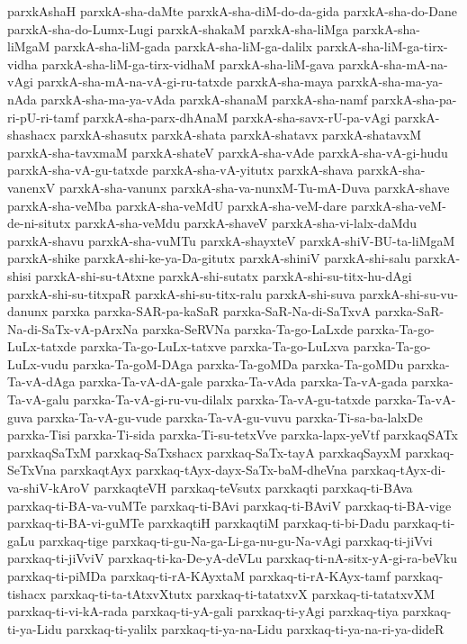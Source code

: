 {parxkAshaH
parxkA-sha-daMte
parxkA-sha-diM-do-da-gida
parxkA-sha-do-Dane
parxkA-sha-do-Lumx-Lugi
parxkA-shakaM
parxkA-sha-liMga
parxkA-sha-liMgaM
parxkA-sha-liM-gada
parxkA-sha-liM-ga-dalilx
parxkA-sha-liM-ga-tirx-vidha
parxkA-sha-liM-ga-tirx-vidhaM
parxkA-sha-liM-gava
parxkA-sha-mA-na-vAgi
parxkA-sha-mA-na-vA-gi-ru-tatxde
parxkA-sha-maya
parxkA-sha-ma-ya-nAda
parxkA-sha-ma-ya-vAda
parxkA-shanaM
parxkA-sha-namf
parxkA-sha-pa-ri-pU-ri-tamf
parxkA-sha-parx-dhAnaM
parxkA-sha-savx-rU-pa-vAgi
parxkA-shashacx
parxkA-shasutx
parxkA-shata
parxkA-shatavx
parxkA-shatavxM
parxkA-sha-tavxmaM
parxkA-shateV
parxkA-sha-vAde
parxkA-sha-vA-gi-hudu
parxkA-sha-vA-gu-tatxde
parxkA-sha-vA-yitutx
parxkA-shava
parxkA-sha-vanenxV
parxkA-sha-vanunx
parxkA-sha-va-nunxM-Tu-mA-Duva
parxkA-shave
parxkA-sha-veMba
parxkA-sha-veMdU
parxkA-sha-veM-dare
parxkA-sha-veM-de-ni-situtx
parxkA-sha-veMdu
parxkA-shaveV
parxkA-sha-vi-lalx-daMdu
parxkA-shavu
parxkA-sha-vuMTu
parxkA-shayxteV
parxkA-shiV-BU-ta-liMgaM
parxkA-shike
parxkA-shi-ke-ya-Da-gitutx
parxkA-shiniV
parxkA-shi-salu
parxkA-shisi
parxkA-shi-su-tAtxne
parxkA-shi-sutatx
parxkA-shi-su-titx-hu-dAgi
parxkA-shi-su-titxpaR
parxkA-shi-su-titx-ralu
parxkA-shi-suva
parxkA-shi-su-vu-danunx
parxka
parxka-SAR-pa-kaSaR
parxka-SaR-Na-di-SaTxvA
parxka-SaR-Na-di-SaTx-vA-pArxNa
parxka-SeRVNa
parxka-Ta-go-LaLxde
parxka-Ta-go-LuLx-tatxde
parxka-Ta-go-LuLx-tatxve
parxka-Ta-go-LuLxva
parxka-Ta-go-LuLx-vudu
parxka-Ta-goM-DAga
parxka-Ta-goMDa
parxka-Ta-goMDu
parxka-Ta-vA-dAga
parxka-Ta-vA-dA-gale
parxka-Ta-vAda
parxka-Ta-vA-gada
parxka-Ta-vA-galu
parxka-Ta-vA-gi-ru-vu-dilalx
parxka-Ta-vA-gu-tatxde
parxka-Ta-vA-guva
parxka-Ta-vA-gu-vude
parxka-Ta-vA-gu-vuvu
parxka-Ti-sa-ba-lalxDe
parxka-Tisi
parxka-Ti-sida
parxka-Ti-su-tetxVve
parxka-lapx-yeVtf
parxkaqSATx
parxkaqSaTxM
parxkaq-SaTxshacx
parxkaq-SaTx-tayA
parxkaqSayxM
parxkaq-SeTxVna
parxkaqtAyx
parxkaq-tAyx-dayx-SaTx-baM-dheVna
parxkaq-tAyx-di-va-shiV-kAroV
parxkaqteVH
parxkaq-teVsutx
parxkaqti
parxkaq-ti-BAva
parxkaq-ti-BA-va-vuMTe
parxkaq-ti-BAvi
parxkaq-ti-BAviV
parxkaq-ti-BA-vige
parxkaq-ti-BA-vi-guMTe
parxkaqtiH
parxkaqtiM
parxkaq-ti-bi-Dadu
parxkaq-ti-gaLu
parxkaq-tige
parxkaq-ti-gu-Na-ga-Li-ga-nu-gu-Na-vAgi
parxkaq-ti-jiVvi
parxkaq-ti-jiVviV
parxkaq-ti-ka-De-yA-deVLu
parxkaq-ti-nA-sitx-yA-gi-ra-beVku
parxkaq-ti-piMDa
parxkaq-ti-rA-KAyxtaM
parxkaq-ti-rA-KAyx-tamf
parxkaq-tishacx
parxkaq-ti-ta-tAtxvXtutx
parxkaq-ti-tatatxvX
parxkaq-ti-tatatxvXM
parxkaq-ti-vi-kA-rada
parxkaq-ti-yA-gali
parxkaq-ti-yAgi
parxkaq-tiya
parxkaq-ti-ya-Lidu
parxkaq-ti-yalilx
parxkaq-ti-ya-na-Lidu
parxkaq-ti-ya-na-ri-ya-dideR
}
